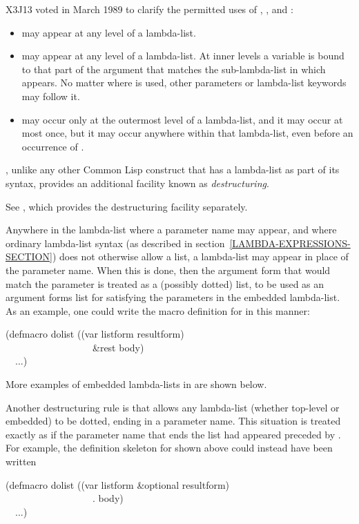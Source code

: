 \begin{defmac}
\begin{newer}
X3J13 voted in March 1989  to clarify the permitted
uses of , , and :
\begin{itemize}
\item {} may appear at any level of a  lambda-list.
\item {} may appear at any level of a  lambda-list.
At inner levels a  variable is bound to that part of the argument
that matches the sub-lambda-list in which  appears.  No matter where
 is used, other parameters or lambda-list keywords may follow it.
\item {} may occur only at the outermost level of a 
lambda-list, and it may occur at most once, but it may occur anywhere within
that lambda-list, even before an occurrence of .
\end{itemize}
\end{newer}

, unlike any other Common Lisp construct that has a lambda-list
as part of its syntax, provides an additional facility known as
\emph{destructuring}.
\begin{newer}
See , which provides the destructuring facility separately.
\end{newer}
Anywhere in the lambda-list where a parameter
name may appear, and where ordinary lambda-list syntax (as described
in section~\ref{LAMBDA-EXPRESSIONS-SECTION}) does not
otherwise allow a list, a lambda-list may appear in place
of the parameter name.  When this is done, then the argument form
that would match the parameter is treated as a (possibly dotted) list,
to be used as an argument forms list for satisfying the
parameters in the embedded lambda-list.
As an example, one could write the macro definition
for  in this manner:
\begin{lisp}
(defmacro dolist ((var listform  resultform) \\
~~~~~~~~~~~~~~~~~~\&rest body) \\
~~...)
\end{lisp}
More examples of embedded lambda-lists in  are shown below.

Another destructuring rule is that  allows any lambda-list
(whether top-level or embedded) to be dotted, ending
in a parameter name.  This situation is treated exactly as if the
parameter name that ends the list had appeared preceded by .
For example, the definition skeleton for  shown above could
instead have been written
\begin{lisp}
(defmacro dolist ((var listform \&optional resultform) \\
~~~~~~~~~~~~~~~~~~. body) \\
~~...)
\end{lisp}


\end{defmac}
